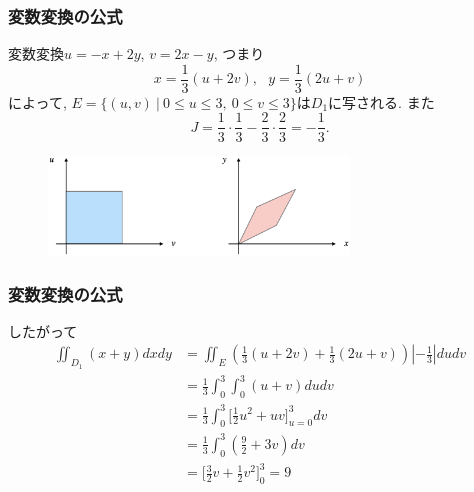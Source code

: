 \documentclass[dvipdfmx,cjk,10.2pt]{beamer}
\theoremstyle{definition}
\begin{document}
\begin{frame}
\frametitle{変数変換の公式}
変数変換$u=-x+2y$, $v=2x-y$, つまり
$$
x=\frac{1}{3}(u+2v), \ \ \ y=\frac{1}{3}(2u+v)
$$
によって, $E= \{(u,v) \ | \ 0 \le u \le 3, \ 0 \le v \le 3\}$は$D_1$に写される. 
また
$$
J  = \frac{1}{3}\cdot \frac{1}{3}-\frac{2}{3} \cdot \frac{2}{3}=-\frac{1}{3}. 
$$
\begin{figure}[htbp]
 \begin{center} 
  \includegraphics[width=80mm]{skew.png}
 \end{center}
\end{figure}

\end{frame}



\begin{frame}
\frametitle{変数変換の公式}

したがって
\begin{align*}
\iint_{D_1} (x+y) dxdy & = \iint_E (\frac{1}{3}(u+2v)+\frac{1}{3}(2u+v) ) |-\frac{1}{3}|dudv \\
& = \frac{1}{3} \int_0^3 \int_0^3 (u+v) dudv \\
& = \frac{1}{3}\int_0^3 \big[\frac{1}{2}u^2+uv\big]_{u=0}^3dv  \\
& =  \frac{1}{3}\int_0^3(\frac{9}{2}+3v)dv\\
&= \big[\frac{3}{2}v+\frac{1}{2}v^2\big]_0^3 = 9 
\end{align*}

\end{frame}



%
%
%
\end{document}
